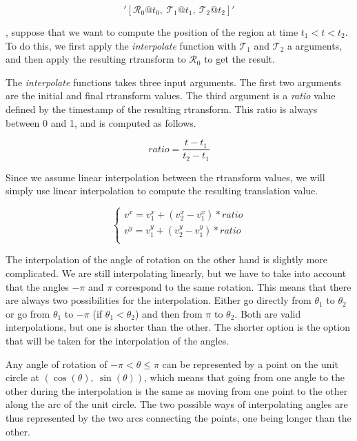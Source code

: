 \[
    '[\mathcal{R}_0@t_0,\ \mathcal{T}_1@t_1,\ \mathcal{T}_2@t_2]'
\]

, suppose that we want to compute the position of the region at time $t_1 < t < t_2$. To do this, we first apply the \textit{interpolate} function with $\mathcal{T}_1$ and $\mathcal{T}_2$ a arguments, and then apply the resulting rtransform to $\mathcal{R}_0$ to get the result.

The \textit{interpolate} functions takes three input arguments. The first two arguments are the initial and final rtransform values. The third argument is a \textit{ratio} value defined by the timestamp of the resulting rtransform. This ratio is always between 0 and 1, and is computed as follows.

\[
    ratio = \frac{t - t_1}{t_2 - t_1}
\]

Since we assume linear interpolation between the rtransform values, we will simply use linear interpolation to compute the resulting translation value.

\[
    \begin{cases}
        v^x = v_1^x + (v_2^x - v_1^x) * ratio \\
        v^y = v_1^y + (v_2^y - v_1^y) * ratio \\
    \end{cases}
\]

The interpolation of the angle of rotation on the other hand is slightly more complicated. We are still interpolating linearly, but we have to take into account that the angles $-\pi$ and $\pi$ correspond to the same rotation. This means that there are always two possibilities for the interpolation. Either go directly from $\theta_1$ to $\theta_2$ or go from $\theta_1$ to $-\pi$ (if $\theta_1 < \theta_2$) and then from $\pi$ to $\theta_2$. Both are valid interpolations, but one is shorter than the other. The shorter option is the option that will be taken for the interpolation of the angles.


Any angle of rotation of $-\pi < \theta \le \pi$ can be represented by a point on the unit circle at $(\cos(\theta),\ \sin(\theta))$, which means that going from one angle to the other during the interpolation is the same as moving from one point to the other along the arc of the unit circle. The two possible ways of interpolating angles are thus represented by the two arcs connecting the points, one being longer than the other.

